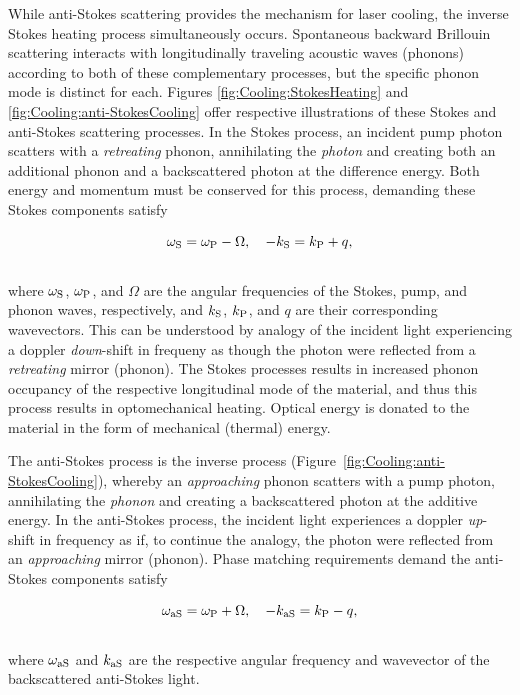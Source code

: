 While anti-Stokes scattering provides the mechanism for laser cooling, the inverse Stokes heating process simultaneously occurs. Spontaneous backward Brillouin scattering interacts with longitudinally traveling acoustic waves (phonons) according to both of these complementary processes, but the specific phonon mode is distinct for each. Figures \ref{fig:Cooling:StokesHeating} and \ref{fig:Cooling:anti-StokesCooling} offer respective illustrations of these Stokes and anti-Stokes scattering processes. In the Stokes process, an incident pump photon scatters with a \emph{retreating} phonon, annihilating the \emph{photon} and creating both an additional phonon and a backscattered photon at the difference energy. Both energy and momentum must be conserved for this process, demanding these Stokes components satisfy

\begin{equation}
\omega_{\rm S} = \omega_{\rm P} - \Omega,
\quad
-k_{\rm S} = k_{\rm P} + q,
\end{equation}
\\
where \(\omega_{\rm S}\), \(\omega_{\rm P}\), and \(\Omega\) are the angular frequencies of the Stokes, pump, and phonon waves, respectively, and \(k_{\rm S}\), \(k_{\rm P}\), and \(q\) are their corresponding wavevectors. This can be understood by analogy of the incident light experiencing a doppler \textit{down}-shift in frequeny as though the photon were reflected from a \emph{retreating} mirror (phonon). The Stokes processes results in increased phonon occupancy of the respective longitudinal mode of the material, and thus this process results in optomechanical heating. Optical energy is donated to the material in the form of mechanical (thermal) energy.

The anti-Stokes process is the inverse process (Figure~\ref{fig:Cooling:anti-StokesCooling}), whereby an \textit{approaching} phonon scatters with a pump photon, annihilating the \textit{phonon} and creating a backscattered photon at the additive energy. In the anti-Stokes process, the incident light experiences a doppler \textit{up}-shift in frequency as if, to continue the analogy, the photon were reflected from an \emph{approaching} mirror (phonon). Phase matching requirements demand the anti-Stokes components satisfy

\begin{equation}
  \omega_{\rm aS} = \omega_{\rm P} + \Omega,
  \quad
  -k_{\rm aS} = k_{\rm P} - q,
  \label{eq:Cooling:anti-Stokes Phase Matching}
\end{equation}
\\
where \(\omega_{\rm aS}\) and \(k_{\rm aS}\) are the respective angular frequency and wavevector of the backscattered anti-Stokes light.

